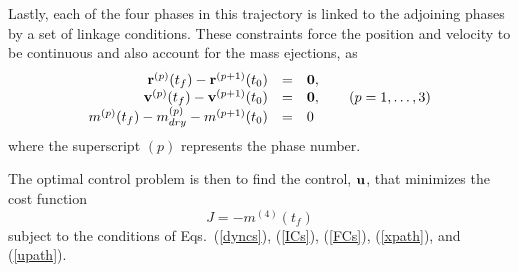 \documentclass[10pt]{article}
\begin{document}
Lastly, each of the four phases in this trajectory is linked to the adjoining phases by a set of linkage conditions.  These constraints force the position and velocity to be continuous and also account for the mass ejections, as
\begin{equation}
\begin{array}{rcl}
{\bf r}^{(p)}(t_f)-{\bf r}^{(p+1)}(t_0) &=& {\bf 0}, \\
{\bf v}^{(p)}(t_f)-{\bf v}^{(p+1)}(t_0) &=& {\bf 0}, \qquad (p=1,\ldots,3)\\
m^{(p)}(t_f)-m_{dry}^{(p)}-m^{(p+1)}(t_0) &=& 0 \\
\end{array}
\end{equation}
where the superscript $(p)$ represents the phase number.

The optimal control problem is then to find the control, ${\bf u}$,
that minimizes the cost function
\begin{equation}
  J=-m^{(4)}(t_f)
\end{equation}
subject to the conditions of Eqs.~(\ref{dyncs}), (\ref{ICs}), (\ref{FCs}),
(\ref{xpath}), and (\ref{upath}).
\end{document}
